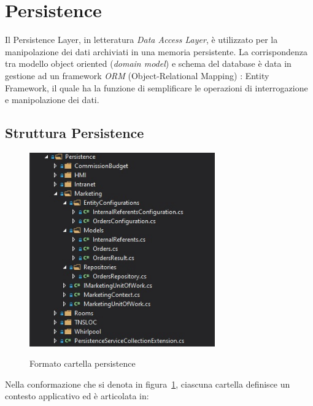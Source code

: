 \section{Persistence}
\label{chap:persistence}
Il Persistence Layer, in letteratura \textit{Data Access Layer}, è utilizzato per la manipolazione dei dati archiviati in una memoria persistente.
La corrispondenza tra modello object oriented (\textit{domain model}) e schema del database è data in gestione ad un framework \textit{ORM} (Object-Relational Mapping) \cite{EF}: Entity Framework, il quale ha la funzione di semplificare le operazioni di interrogazione e manipolazione dei dati.

\subsection{Struttura Persistence}
\begin{figure}[h!]
\begin{center}
  \includegraphics[width=8cm]{images/Persistence.jpg}\\
  \caption{Formato cartella persistence}\label{fig:persistence}
\end{center}
\end{figure}
\FloatBarrier

Nella conformazione che si denota in figura~\ref{fig:persistence}, ciascuna cartella definisce un contesto applicativo ed è articolata in:

